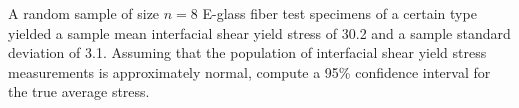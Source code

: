 \documentclass[twoside]{book}\usepackage[]{graphicx}\usepackage[]{xcolor}
\begin{document}
% 
% 

\begin{problem}
	A random sample of size $n = 8$ E-glass fiber test specimens of a certain 
	type yielded a sample mean interfacial shear yield stress of 30.2 and a sample
	standard deviation of 3.1.  Assuming that the population of interfacial shear 
	yield stress measurements is approximately normal, compute a 95\% confidence
	interval for the true average stress.
\end{problem}
\end{document}
